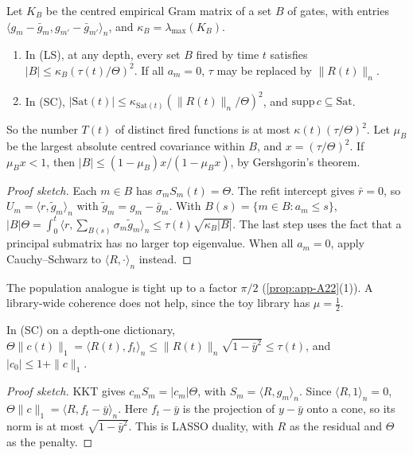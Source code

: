 \begin{theorem}\label{thm:app-A23}
\quad Let $K_B$ be the centred empirical Gram matrix of a set $B$ of gates, with entries $\langle g_m-\bar g_m,g_{m'}-\bar g_{m'}\rangle_n$, and $\kappa_B=\lambda_{\max}(K_B)$.
\begin{enumerate}[label=(\arabic*),nosep]
\item In (LS), at any depth, every set $B$ fired by time $t$ satisfies $|B|\le\kappa_B(\tau(t)/\Theta)^2$. If all $a_m=0$, $\tau$ may be replaced by $\|R(t)\|_n$.
\item In (SC), $|\mathrm{Sat}(t)|\le\kappa_{\mathrm{Sat}(t)}(\|R(t)\|_n/\Theta)^2$, and $\mathrm{supp}\,c\subseteq\mathrm{Sat}$.
\end{enumerate}
So the number $T(t)$ of distinct fired functions is at most $\kappa(t)(\tau/\Theta)^2$. Let $\mu_B$ be the largest absolute centred covariance within $B$, and $x=(\tau/\Theta)^2$. If $\mu_Bx<1$, then $|B|\le(1-\mu_B)x/(1-\mu_Bx)$, by Gershgorin's theorem.
\end{theorem}
\begin{proof}[Proof sketch]
Each $m\in B$ has $\sigma_mS_m(t)=\Theta$. The refit intercept gives $\bar r=0$, so $U_m=\langle r,\tilde g_m\rangle_n$ with $\tilde g_m=g_m-\bar g_m$. With $B(s)=\{m\in B:a_m\le s\}$, $|B|\Theta=\int_0^t\langle r,\sum_{B(s)}\sigma_m\tilde g_m\rangle_n\le\tau(t)\sqrt{\kappa_B|B|}$. The last step uses the fact that a principal submatrix has no larger top eigenvalue. When all $a_m=0$, apply Cauchy--Schwarz to $\langle R,\cdot\rangle_n$ instead.
\end{proof}
The population analogue is tight up to a factor $\pi/2$ (\cref{prop:app-A22}(1)). A library-wide coherence does not help, since the toy library has $\mu=\frac12$.

\begin{theorem}\label{thm:app-A24}
\quad In (SC) on a depth-one dictionary, $\Theta\|c(t)\|_1=\langle R(t),f_t\rangle_n\le\|R(t)\|_n\sqrt{1-\bar y^2}\le\tau(t)$, and $|c_0|\le1+\|c\|_1$.
\end{theorem}
\begin{proof}[Proof sketch]
KKT gives $c_mS_m=|c_m|\Theta$, with $S_m=\langle R,g_m\rangle_n$. Since $\langle R,1\rangle_n=0$, $\Theta\|c\|_1=\langle R,f_t-\bar y\rangle_n$. Here $f_t-\bar y$ is the projection of $y-\bar y$ onto a cone, so its norm is at most $\sqrt{1-\bar y^2}$. This is LASSO duality, with $R$ as the residual and $\Theta$ as the penalty.
\end{proof}

